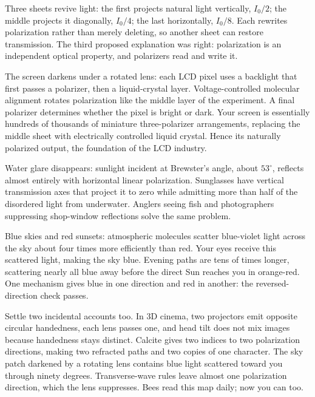 Three sheets revive light: the first projects natural light vertically, \(I_0/2\); the middle projects it diagonally, \(I_0/4\); the last horizontally, \(I_0/8\). Each rewrites polarization rather than merely deleting, so another sheet can restore transmission. The third proposed explanation was right: polarization is an independent optical property, and polarizers read and write it.

The screen darkens under a rotated lens: each LCD pixel uses a backlight that first passes a polarizer, then a liquid-crystal layer. Voltage-controlled molecular alignment rotates polarization like the middle layer of the experiment. A final polarizer determines whether the pixel is bright or dark. Your screen is essentially hundreds of thousands of miniature three-polarizer arrangements, replacing the middle sheet with electrically controlled liquid crystal. Hence its naturally polarized output, the foundation of the LCD industry.

Water glare disappears: sunlight incident at Brewster's angle, about \(53^\circ\), reflects almost entirely with horizontal linear polarization. Sunglasses have vertical transmission axes that project it to zero while admitting more than half of the disordered light from underwater. Anglers seeing fish and photographers suppressing shop-window reflections solve the same problem.

Blue skies and red sunsets: atmospheric molecules scatter blue-violet light across the sky about four times more efficiently than red. Your eyes receive this scattered light, making the sky blue. Evening paths are tens of times longer, scattering nearly all blue away before the direct Sun reaches you in orange-red. One mechanism gives blue in one direction and red in another: the reversed-direction check passes.

Settle two incidental accounts too. In 3D cinema, two projectors emit opposite circular handedness, each lens passes one, and head tilt does not mix images because handedness stays distinct. Calcite gives two indices to two polarization directions, making two refracted paths and two copies of one character. The sky patch darkened by a rotating lens contains blue light scattered toward you through ninety degrees. Transverse-wave rules leave almost one polarization direction, which the lens suppresses. Bees read this map daily; now you can too.


